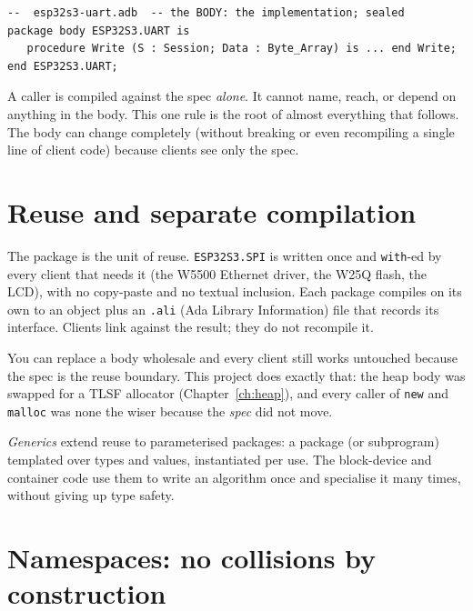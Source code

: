 \begin{lstlisting}
--  esp32s3-uart.adb  -- the BODY: the implementation; sealed
package body ESP32S3.UART is
   procedure Write (S : Session; Data : Byte_Array) is ... end Write;
end ESP32S3.UART;
\end{lstlisting}

A caller is compiled against the spec \emph{alone}. It cannot name, reach, or depend
on anything in the body. This one rule is the root of almost everything that follows.
The body can change completely (without breaking or even recompiling a single line of
client code) because clients see only the spec.


\section{Reuse and separate compilation}

The package is the unit of reuse. \texttt{ESP32S3.SPI} is written once and
\texttt{with}-ed by every client that needs it (the W5500 Ethernet driver, the W25Q
flash, the LCD), with no copy-paste and no textual inclusion. Each package compiles
on its own to an object plus an \texttt{.ali} (Ada Library Information) file that
records its interface. Clients link against the result; they do not recompile it.

You can replace a body wholesale and every client still works untouched because the
spec is the reuse boundary. This project does exactly that: the heap body was
swapped for a TLSF allocator (Chapter~\ref{ch:heap}), and every caller of
\texttt{new} and \texttt{malloc} was none the wiser because the \emph{spec} did not
move.

\emph{Generics} extend reuse to parameterised packages: a package (or subprogram)
templated over types and values, instantiated per use. The block-device and
container code use them to write an algorithm once and specialise it many times,
without giving up type safety.

\section{Namespaces: no collisions by construction}

